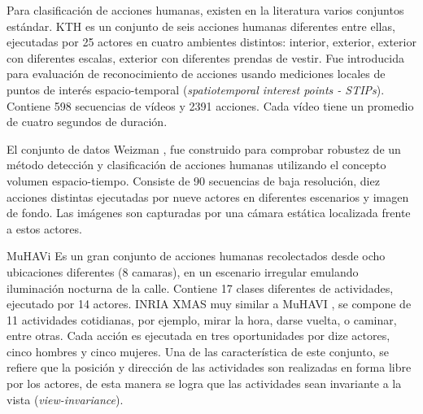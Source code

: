 Para clasificación de acciones humanas, existen en la literatura varios conjuntos estándar. KTH \cite{schuldt_recognizing_2004} es un conjunto de seis acciones humanas diferentes entre ellas, ejecutadas por 25 actores en cuatro ambientes distintos: interior, exterior, exterior con diferentes escalas, exterior con diferentes prendas de vestir. Fue introducida para evaluación de reconocimiento de acciones usando mediciones locales de puntos de interés espacio-temporal (\textit{spatiotemporal interest points - STIPs}). Contiene 598 secuencias de vídeos y 2391 acciones. Cada vídeo tiene un promedio de cuatro segundos de duración.

El conjunto de datos Weizman \cite {gorelick_actions_2007}, fue construido para comprobar robustez de un método detección y clasificación de acciones humanas utilizando el concepto volumen espacio-tiempo. Consiste de 90 secuencias de baja resolución, diez acciones distintas ejecutadas por nueve actores en diferentes escenarios y imagen de fondo. Las imágenes son capturadas por una cámara estática localizada frente a estos actores. 

MuHAVi \cite{singh_muhavi_2010} Es un gran conjunto de acciones humanas recolectados desde ocho ubicaciones diferentes (8 camaras), en un escenario irregular emulando iluminación nocturna de la calle. Contiene 17 clases diferentes de actividades, ejecutado por 14 actores. INRIA XMAS \cite{weinland_free_2006} muy similar a MuHAVI \cite{singh_muhavi_2010}, se compone de 11 actividades cotidianas, por ejemplo, mirar la hora, darse vuelta, o caminar, entre otras. Cada acción es ejecutada en tres oportunidades por dize actores, cinco hombres y cinco mujeres. Una de las característica de este conjunto, se refiere que la posición y dirección de las actividades son realizadas en forma libre por los actores, de esta manera se logra que las actividades sean invariante a la vista (\textit{view-invariance}). 







